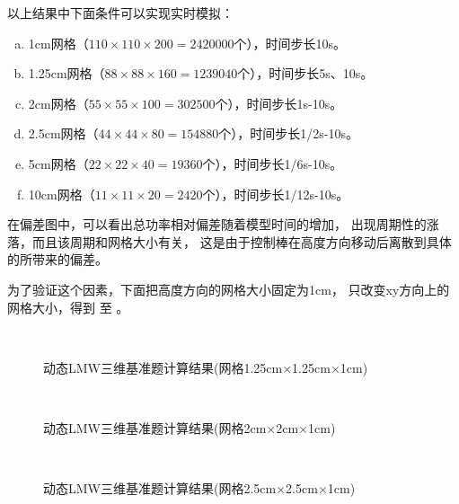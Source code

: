\clearpage
以上结果中下面条件可以实现实时模拟：
\begin{enumerate}[a)]
\item 1cm网格（$110\times110\times200=2420000$个），时间步长10s。
\item 1.25cm网格（$88\times88\times160=1239040$个），时间步长5s、10s。
\item 2cm网格（$55\times55\times100=302500$个），时间步长1s-10s。
\item 2.5cm网格（$44\times44\times80=154880$个），时间步长1/2s-10s。
\item 5cm网格（$22\times22\times40=19360$个），时间步长1/6s-10s。
\item 10cm网格（$11\times11\times20=2420$个），时间步长1/12s-10s。
\end{enumerate}

在偏差图中，可以看出总功率相对偏差随着模型时间的增加，
出现周期性的涨落，而且该周期和网格大小有关，
这是由于控制棒在高度方向移动后离散到具体的所带来的偏差。

为了验证这个因素，下面把高度方向的网格大小固定为1cm，
只改变xy方向上的网格大小，得到
至
。

\begin{figure}[H]
\centering
{}
\\[1cm]
\caption{动态LMW三维基准题计算结果(网格1.25cm$\times$1.25cm$\times$1cm)\label{fig:testresult.lwm.125z1}}
\end{figure}

\begin{figure}[H]
\centering
{}
\\[1cm]
\caption{动态LMW三维基准题计算结果(网格2cm$\times$2cm$\times$1cm)\label{fig:testresult.lwm.2z1}}
\end{figure}

\begin{figure}[H]
\centering
{}
\\[1cm]
\caption{动态LMW三维基准题计算结果(网格2.5cm$\times$2.5cm$\times$1cm)\label{fig:testresult.lwm.25z1}}
\end{figure}

